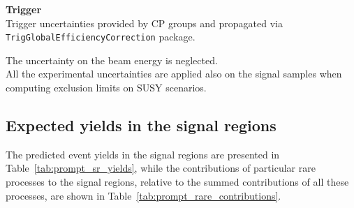 \textbf{Trigger}\\
Trigger uncertainties provided by CP groups and propagated via \texttt{TrigGlobalEfficiencyCorrection} package.

The uncertainty on the beam energy is neglected. \\

All the experimental uncertainties are applied also on the signal samples when computing exclusion limits on SUSY scenarios. 



\subsection{Expected yields in the signal regions}
\label{subsec:promptbkg_yields}

The predicted event yields in the signal regions are presented in Table~\ref{tab:prompt_sr_yields}, while the contributions of particular rare processes to the signal regions, relative to the summed contributions of all these processes, are shown in Table~\ref{tab:prompt_rare_contributions}.

